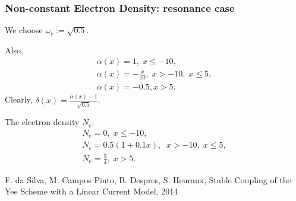 \documentclass[a4paper,10pt]{article}
\begin{document}
\subsubsection{Non-constant Electron Density: resonance case}
We choose $\omega_c:=\sqrt{0.5}$.

Also, 
\begin{align*}
\alpha(x)=1,\; x\leq -10,\\
\alpha(x)=-\frac{x}{10}, \; x>-10,\; x\leq 5,\\
\alpha(x)=-0.5, x>5.
\end{align*}
Clearly, $\delta(x)=\frac{\alpha(x)-1}{\sqrt{0.5}}$.

The electron density $N_e$:
\begin{align*}
 N_e=0,\; x\leq -10,\\
 N_e=0.5(1+0.1x),\;  \; x>-10,\; x\leq 5,\\
 N_e=\frac{3}{4},\; x>5.
\end{align*}






\begin{thebibliography}{99}
 F. da Silva, M. Campos Pinto, B. Despres, S. Heuraux, Stable Coupling of the Yee Scheme with a Linear Current Model,
2014
\end{thebibliography}
\end{document}
